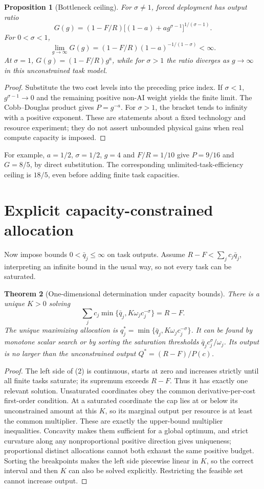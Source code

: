 \documentclass[11pt,a4paper]{article}
\newtheorem{theorem}{Theorem}[section]
\newtheorem{proposition}[theorem]{Proposition}
\theoremstyle{definition}
\theoremstyle{remark}
\begin{document}
\begin{proposition}[Bottleneck ceiling]
For $\sigma\ne1$, forced deployment has output ratio
\[
 G(g)=(1-F/R)\bigl[(1-a)+a g^{\sigma-1}\bigr]^{1/(\sigma-1)}.
\]
For $0<\sigma<1$,
\[
 \lim_{g\to\infty}G(g)=(1-F/R)(1-a)^{-1/(1-\sigma)}<\infty.
\]
At $\sigma=1$, $G(g)=(1-F/R)g^a$, while for $\sigma>1$ the ratio diverges as $g\to\infty$ in this unconstrained task model.
\end{proposition}
\begin{proof}
Substitute the two cost levels into the preceding price index. If $\sigma<1$, $g^{\sigma-1}\to0$ and the remaining positive non-AI weight yields the finite limit. The Cobb--Douglas product gives $P=g^{-a}$. For $\sigma>1$, the bracket tends to infinity with a positive exponent. These are statements about a fixed technology and resource experiment; they do not assert unbounded physical gains when real compute capacity is imposed.
\end{proof}

For example, $a=1/2$, $\sigma=1/2$, $g=4$ and $F/R=1/10$ give $P=9/16$ and $G=8/5$, by direct substitution. The corresponding unlimited-task-efficiency ceiling is $18/5$, even before adding finite task capacities.

\section{Explicit capacity-constrained allocation}
Now impose bounds $0<\bar q_j\leq\infty$ on task outputs. Assume $R-F<\sum_jc_j\bar q_j$, interpreting an infinite bound in the usual way, so not every task can be saturated.

\begin{theorem}[One-dimensional determination under capacity bounds]
There is a unique $K>0$ solving
\[
 \sum_j c_j\min\{\bar q_j,K\omega_jc_j^{-\sigma}\}=R-F.\tag{2}
\]
The unique maximizing allocation is
$q_j^*=\min\{\bar q_j,K\omega_jc_j^{-\sigma}\}$. It can be found by monotone scalar search or by sorting the saturation thresholds $\bar q_jc_j^\sigma/\omega_j$. Its output is no larger than the unconstrained output $Q^*=(R-F)/P(c)$.
\end{theorem}
\begin{proof}
The left side of (2) is continuous, starts at zero and increases strictly until all finite tasks saturate; its supremum exceeds $R-F$. Thus it has exactly one relevant solution. Unsaturated coordinates obey the common derivative-per-cost first-order condition. At a saturated coordinate the cap lies at or below its unconstrained amount at this $K$, so its marginal output per resource is at least the common multiplier. These are exactly the upper-bound multiplier inequalities. Concavity makes them sufficient for a global optimum, and strict curvature along any nonproportional positive direction gives uniqueness; proportional distinct allocations cannot both exhaust the same positive budget. Sorting the breakpoints makes the left side piecewise linear in $K$, so the correct interval and then $K$ can also be solved explicitly. Restricting the feasible set cannot increase output.
\end{proof}
\end{document}
